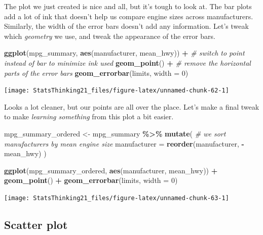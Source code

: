 \documentclass[
  12pt,
]{book}
\newenvironment{Shaded}{\begin{snugshade}}{\end{snugshade}}
\newcommand{\AttributeTok}[1]{\textcolor[rgb]{0.13,0.29,0.53}{#1}}
\newcommand{\CommentTok}[1]{\textcolor[rgb]{0.56,0.35,0.01}{\textit{#1}}}
\newcommand{\DecValTok}[1]{\textcolor[rgb]{0.00,0.00,0.81}{#1}}
\newcommand{\FunctionTok}[1]{\textcolor[rgb]{0.13,0.29,0.53}{\textbf{#1}}}
\newcommand{\NormalTok}[1]{#1}
\newcommand{\OtherTok}[1]{\textcolor[rgb]{0.56,0.35,0.01}{#1}}
\newcommand{\SpecialCharTok}[1]{\textcolor[rgb]{0.81,0.36,0.00}{\textbf{#1}}}
\begin{document}
The plot we just created is nice and all, but it's tough to look at. The bar plots add a lot of ink that doesn't help us compare engine sizes across manufacturers. Similarly, the width of the error bars doesn't add any information. Let's tweak which \emph{geometry} we use, and tweak the appearance of the error bars.

\begin{Shaded}
\begin{Highlighting}[]
\FunctionTok{ggplot}\NormalTok{(mpg\_summary, }\FunctionTok{aes}\NormalTok{(manufacturer, mean\_hwy)) }\SpecialCharTok{+}
  \CommentTok{\# switch to point instead of bar to minimize ink used}
  \FunctionTok{geom\_point}\NormalTok{() }\SpecialCharTok{+} 
  \CommentTok{\# remove the horizontal parts of the error bars}
  \FunctionTok{geom\_errorbar}\NormalTok{(limits, }\AttributeTok{width =} \DecValTok{0}\NormalTok{) }
\end{Highlighting}
\end{Shaded}

\texttt{[image: StatsThinking21\_files/figure-latex/unnamed-chunk-62-1]}

Looks a lot cleaner, but our points are all over the place. Let's make a final tweak to make \emph{learning something} from this plot a bit easier.

\begin{Shaded}
\begin{Highlighting}[]
\NormalTok{mpg\_summary\_ordered }\OtherTok{\textless{}{-}}\NormalTok{ mpg\_summary }\SpecialCharTok{\%\textgreater{}\%}
  \FunctionTok{mutate}\NormalTok{(}
    \CommentTok{\# we sort manufacturers by mean engine size}
    \AttributeTok{manufacturer =} \FunctionTok{reorder}\NormalTok{(manufacturer, }\SpecialCharTok{{-}}\NormalTok{mean\_hwy)}
\NormalTok{  )}

\FunctionTok{ggplot}\NormalTok{(mpg\_summary\_ordered, }\FunctionTok{aes}\NormalTok{(manufacturer, mean\_hwy)) }\SpecialCharTok{+}
  \FunctionTok{geom\_point}\NormalTok{() }\SpecialCharTok{+} 
  \FunctionTok{geom\_errorbar}\NormalTok{(limits, }\AttributeTok{width =} \DecValTok{0}\NormalTok{) }
\end{Highlighting}
\end{Shaded}

\texttt{[image: StatsThinking21\_files/figure-latex/unnamed-chunk-63-1]}

\hypertarget{scatter-plot}{%
\subsection{Scatter plot}\label{scatter-plot}}
\end{document}
